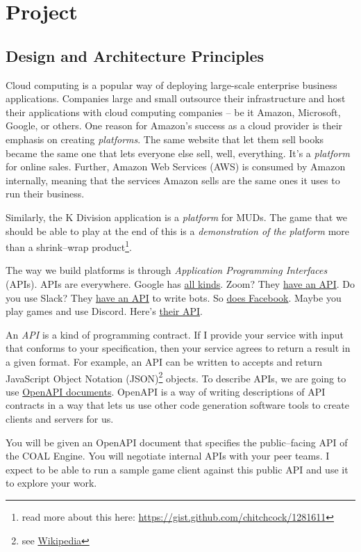 \documentclass{article}
\newcommand{\enterProblemHeader}[1]{
}
\newcommand{\exitProblemHeader}[1]{
\nobreak\extramarks{#1}{}\nobreak
}
\newcounter{homeworkProblemCounter} %
\newcommand{\homeworkProblemName}{}
\newenvironment{homeworkProblem}[1][Problem \arabic{homeworkProblemCounter}]{ %
\stepcounter{homeworkProblemCounter} %
\renewcommand{\homeworkProblemName}{#1} %
\section{\homeworkProblemName} %
\enterProblemHeader{\homeworkProblemName} %
}{
\exitProblemHeader{\homeworkProblemName} %
}
\newcommand{\homeworkSectionName}{}
\newenvironment{homeworkSection}[1]{ %
\renewcommand{\homeworkSectionName}{#1} %
\subsection{\homeworkSectionName} %
\enterProblemHeader{\homeworkProblemName\ [\homeworkSectionName]} %
}{
\enterProblemHeader{\homeworkProblemName} %
}
\begin{document}
\begin{homeworkProblem}[Project]
\begin{homeworkSection}{Design and Architecture Principles}
  Cloud computing is a popular way of deploying large-scale enterprise business applications. Companies large and small outsource their infrastructure and host their applications with cloud computing companies -- be it Amazon, Microsoft, Google, or others. One reason for Amazon's success as a cloud provider is their emphasis on creating \textit{platforms}. The same website that let them sell books became the same one that lets everyone else sell, well, everything. It's a \textit{platform} for online sales. Further, Amazon Web Services (AWS) is consumed by Amazon internally, meaning that the services Amazon sells are the same ones it uses to run their business.
  
  Similarly, the K Division application is a \textit{platform} for MUDs. The game that we should be able to play at the end of this is a \textit{demonstration of the platform} more than a shrink--wrap product\footnote{read more about this here: \url{https://gist.github.com/chitchcock/1281611}}.
  
  The way we build platforms is through \textit{Application Programming Interfaces} (APIs). APIs are everywhere. Google has \href{https://developers.google.com/apis-explorer}{all kinds}. Zoom? They \href{https://marketplace.zoom.us/docs/api-reference/zoom-api}{have an API}. Do you use Slack? They \href{https://api.slack.com/}{have an API} to write bots. So \href{https://developers.facebook.com/}{does Facebook}. Maybe you play games and use Discord. Here's \href{https://discord.com/developers/docs/intro}{their API}.
  
	An \textit{API} is a kind of programming contract. If I provide your service with input that conforms to your specification, then your service agrees to return a result in a given format. For example, an API can be written to accepts and return JavaScript Object Notation (JSON)\footnote{see \href{https://en.wikipedia.org/wiki/JSON}{Wikipedia}} objects. To describe APIs, we are going to use \href{https://swagger.io/specification/}{OpenAPI documents}. OpenAPI is a way of writing descriptions of API contracts in a way that lets us use other code generation software tools to create clients and servers for us.

  You will be given an OpenAPI document that specifies the public--facing API of the COAL Engine. You will negotiate internal APIs with your peer teams. I expect to be able to run a sample game client against this public API and use it to explore your work.
	

\end{homeworkSection}
\end{homeworkProblem}
\end{document}
